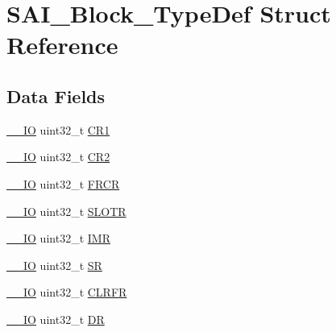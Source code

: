 \hypertarget{struct_s_a_i___block___type_def}{}\section{S\+A\+I\+\_\+\+Block\+\_\+\+Type\+Def Struct Reference}
\label{struct_s_a_i___block___type_def}
\subsection*{Data Fields}
\begin{DoxyCompactItemize}
\item 
\mbox{\hyperlink{core__sc300_8h_aec43007d9998a0a0e01faede4133d6be}{\+\_\+\+\_\+\+IO}} uint32\+\_\+t \mbox{\hyperlink{struct_s_a_i___block___type_def_ab0ec7102960640751d44e92ddac994f0}{C\+R1}}
\item 
\mbox{\hyperlink{core__sc300_8h_aec43007d9998a0a0e01faede4133d6be}{\+\_\+\+\_\+\+IO}} uint32\+\_\+t \mbox{\hyperlink{struct_s_a_i___block___type_def_afdfa307571967afb1d97943e982b6586}{C\+R2}}
\item 
\mbox{\hyperlink{core__sc300_8h_aec43007d9998a0a0e01faede4133d6be}{\+\_\+\+\_\+\+IO}} uint32\+\_\+t \mbox{\hyperlink{struct_s_a_i___block___type_def_ae307d5a553582e6c9717f50037245710}{F\+R\+CR}}
\item 
\mbox{\hyperlink{core__sc300_8h_aec43007d9998a0a0e01faede4133d6be}{\+\_\+\+\_\+\+IO}} uint32\+\_\+t \mbox{\hyperlink{struct_s_a_i___block___type_def_ad30f20f612dacf85a5bb7f9f97cf0772}{S\+L\+O\+TR}}
\item 
\mbox{\hyperlink{core__sc300_8h_aec43007d9998a0a0e01faede4133d6be}{\+\_\+\+\_\+\+IO}} uint32\+\_\+t \mbox{\hyperlink{struct_s_a_i___block___type_def_ae845b86e973b4bf8a33c447c261633f6}{I\+MR}}
\item 
\mbox{\hyperlink{core__sc300_8h_aec43007d9998a0a0e01faede4133d6be}{\+\_\+\+\_\+\+IO}} uint32\+\_\+t \mbox{\hyperlink{struct_s_a_i___block___type_def_af6aca2bbd40c0fb6df7c3aebe224a360}{SR}}
\item 
\mbox{\hyperlink{core__sc300_8h_aec43007d9998a0a0e01faede4133d6be}{\+\_\+\+\_\+\+IO}} uint32\+\_\+t \mbox{\hyperlink{struct_s_a_i___block___type_def_aa46ece753867049c7643819478b8330b}{C\+L\+R\+FR}}
\item 
\mbox{\hyperlink{core__sc300_8h_aec43007d9998a0a0e01faede4133d6be}{\+\_\+\+\_\+\+IO}} uint32\+\_\+t \mbox{\hyperlink{struct_s_a_i___block___type_def_a3df0d8dfcd1ec958659ffe21eb64fa94}{DR}}
\end{DoxyCompactItemize}



